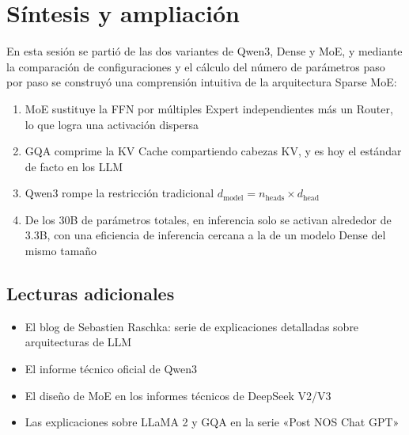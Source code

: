 \section{Síntesis y ampliación}

En esta sesión se partió de las dos variantes de Qwen3, Dense y MoE, y mediante la comparación de configuraciones y el cálculo del número de parámetros paso por paso se construyó una comprensión intuitiva de la arquitectura Sparse MoE:

\begin{enumerate}
  \item MoE sustituye la FFN por múltiples Expert independientes más un Router, lo que logra una activación dispersa
  \item GQA comprime la KV Cache compartiendo cabezas KV, y es hoy el estándar de facto en los LLM
  \item Qwen3 rompe la restricción tradicional $d_{\text{model}} = n_{\text{heads}} \times d_{\text{head}}$
  \item De los 30B de parámetros totales, en inferencia solo se activan alrededor de 3.3B, con una eficiencia de inferencia cercana a la de un modelo Dense del mismo tamaño
\end{enumerate}

\subsection{Lecturas adicionales}

\begin{itemize}
  \item El blog de Sebastien Raschka: serie de explicaciones detalladas sobre arquitecturas de LLM
  \item El informe técnico oficial de Qwen3
  \item El diseño de MoE en los informes técnicos de DeepSeek V2/V3
  \item Las explicaciones sobre LLaMA 2 y GQA en la serie «Post NOS Chat GPT»
\end{itemize}



